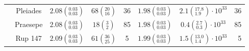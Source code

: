 \begin{tabular}{lccccccr}
          & Pleiades &  $2.08\left(^{0.03}_{0.03}\right)$ &        $68\left(^{20}_{16}\right)$ &             36 &  $1.98\left(^{0.03}_{0.03}\right)$ &  $2.1\left(^{17.8}_{1.9}\right)\cdot 10^{33}$ &               36 \\
          & Praesepe &  $2.08\left(^{0.03}_{0.03}\right)$ &          $18\left(^{3}_{2}\right)$ &             85 &  $1.98\left(^{0.03}_{0.03}\right)$ &   $0.4\left(^{2.7}_{0.3}\right)\cdot 10^{33}$ &               85 \\
          & Rup 147 &  $2.09\left(^{0.03}_{0.03}\right)$ &        $61\left(^{36}_{25}\right)$ &              5 &  $1.99\left(^{0.03}_{0.03}\right)$ &  $1.5\left(^{13.0}_{1.4}\right)\cdot 10^{33}$ &                5 \\
\hline

\end{tabular}
